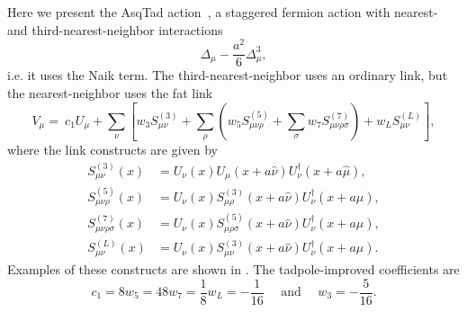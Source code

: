 Here we present the AsqTad
action~\cite{orginos_variants_1999,lepage_flavor-symmetry_1999}, a staggered
fermion action with nearest- and third-nearest-neighbor interactions
\begin{equation}
  \Delta_\mu-\frac{a^2}{6}\Delta_\mu^3,
\end{equation}
i.e. it uses the Naik term.
The third-nearest-neighbor uses an ordinary link, but the nearest-neighbor
uses the fat link
\begin{equation}
  V_\mu=~c_1U_\mu
           +\sum_\nu\left[w_3S_{\mu\nu}^{(3)}
           +\sum_\rho\left(w_5S_{\mu\nu\rho}^{(5)}
           +\sum_\sigma w_7S^{(7)}_{\mu\nu\rho\sigma}\right)
            +w_LS^{(L)}_{\mu\nu}\right],
\end{equation}
where the link constructs are given by
\begin{equation}\begin{aligned}
  S_{\mu\nu}^{(3)}(x)
       &=U_\nu(x)U_\mu(x+a\hat{\nu})U_\nu^\dagger(x+a\hat{\mu}),\\
  S_{\mu\nu\rho}^{(5)}(x)
       &=U_\nu(x)S_{\mu\rho}^{(3)}(x+a\hat{\nu})U_\nu^\dagger(x+a\hat{\mu}),\\
  S_{\mu\nu\rho\sigma}^{(7)}(x)
       &=U_\nu(x)S_{\mu\rho\sigma}^{(5)}(x+a\hat{\nu})
         U_\nu^\dagger(x+a\hat{\mu}),\\
  S_{\mu\nu}^{(L)}(x)
       &=U_\nu(x)S_{\mu\nu}^{(3)}(x+a\hat{\nu})U_\nu^\dagger(x+a\hat{\mu}).
\end{aligned}\end{equation}
Examples of these constructs are shown in .
The tadpole-improved coefficients are
\begin{equation}
  c_1=8w_5=48w_7=\frac{1}{8}w_L=-\frac{1}{16}~~~~~~\text{and}~~~~~~
     w_3=-\frac{5}{16}.
\end{equation}




